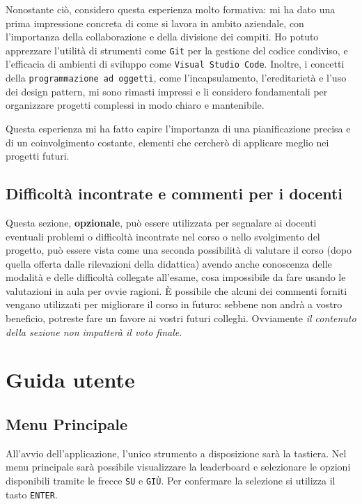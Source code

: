 \documentclass[a4paper,12pt]{report}
\begin{document}
Nonostante ciò, considero questa esperienza molto formativa: mi ha dato una prima impressione concreta di come si lavora in ambito aziendale, con l'importanza della collaborazione e della divisione dei compiti. Ho potuto apprezzare l'utilità di strumenti come \texttt{Git} per la gestione del codice condiviso, e l'efficacia di ambienti di sviluppo come \texttt{Visual Studio Code}. Inoltre, i concetti della \texttt{programmazione ad oggetti}, come l'incapsulamento, l'ereditarietà e l'uso dei design pattern, mi sono rimasti impressi e li considero fondamentali per organizzare progetti complessi in modo chiaro e mantenibile.

Questa esperienza mi ha fatto capire l'importanza di una pianificazione precisa e di un coinvolgimento costante, elementi che cercherò di applicare meglio nei progetti futuri.

\section{Difficoltà incontrate e commenti per i docenti}

Questa sezione, \textbf{opzionale}, può essere utilizzata per segnalare ai docenti eventuali problemi o difficoltà incontrate nel corso o nello svolgimento del progetto, può essere vista come una seconda possibilità di valutare il corso (dopo quella offerta dalle rilevazioni della didattica) avendo anche conoscenza delle modalità e delle difficoltà collegate all'esame, cosa impossibile da fare usando le valutazioni in aula per ovvie ragioni.
%
È possibile che alcuni dei commenti forniti vengano utilizzati per migliorare il corso in futuro: sebbene non andrà a vostro beneficio, potreste fare un favore ai vostri futuri colleghi.
%
Ovviamente \textit{il contenuto della sezione non impatterà il voto finale}.

\appendix
\chapter{Guida utente}

\section{Menu Principale}
All'avvio dell'applicazione, l'unico strumento a disposizione sarà la tastiera. Nel menu principale sarà possibile visualizzare la leaderboard e selezionare le opzioni disponibili tramite le frecce \texttt{SU} e \texttt{GIÙ}. Per confermare la selezione si utilizza il tasto \texttt{ENTER}.
\end{document}
